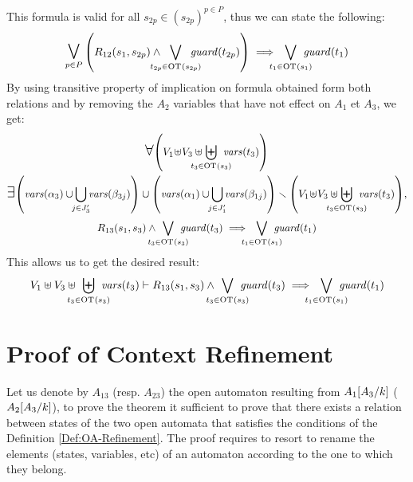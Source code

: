 \documentclass[runningheads]{llncs}
\begin{document}
\begin{enumerate}
This formula is valid for all $s_{2p} \in (s_{2p})^{p\in P}$,  thus we can state the following:
\begin{align*}
\operatorname*{\bigsymb{\bigvee}}_{p\in P}\mpar{R_{12}\mpar{s_1, s_{2p}} \wedge \bigvee_\subbox{t_{2p} \in \fOT{s_{2p}}} \fguard{t_{2p}} }  \implies \bigvee_\subbox{t_1 \in \fOT{s_1}} \fguard{t_1}
\end{align*}
By using transitive property of implication on formula obtained form both relations and by removing the $A_2$ variables that have not effect on   $A_1$ et  $A_3$, we get:
\begin{multline*}
\everymath{\displaystyle}
\bigforall \mpar{V_1\! \uplus\!V_3 \uplus\!\! \biguplus_\subbox{t_3 \in \fOT{s_3}} \fvars{t_3}}\\
\bigexists \mpar{\fvars{\alpha_{3}}  \cup \!\!\bigcup_{j \in J'_{3}} \!\!\fvars{\beta_{3j}}} \cup \mpar{\fvars{\alpha_{1}}  \cup\!\! \bigcup_{j \in J'_{1}} \!\!\fvars{\beta_{1j}}}
 \setminus \mpar{V_1\! \uplus\!V_3 \uplus\!\! \biguplus_\subbox{t_3 \in \fOT{s_3}} \fvars{t_3}},\\
R_{13}\mpar{s_1,s_3} \wedge \bigvee_\subbox{t_3 \in \fOT{s_3}} \fguard{t_3}
\implies \bigvee_\subbox{t_1 \in \fOT{s_1}} \fguard{t_1}
\end{multline*}
This allows us to get the desired result:
\begin{multline*}
V_1 \uplus V_3 \uplus \biguplus_\subbox{t_3 \in \fOT{s_3}} \fvars{t_3}
\vdash R_{13}\mpar{s_1,s_3} \wedge \bigvee_\subbox{t_3 \in \fOT{s_3}} \fguard{t_3}
\implies \bigvee_\subbox{t_1 \in \fOT{s_1}} \fguard{t_1}
\end{multline*}

\end{enumerate}

















\section{Proof of Context Refinement}

\proof
Let us denote by $A_{13}$ (resp. $A_{23}$) the open automaton resulting from $A_1{\left[A_3\middle/k\right]}$ ($A_2{\left[A_3\middle/k\right]}$),  to prove the theorem it sufficient to prove that there exists a relation between states of the two open automata that satisfies the conditions of the Definition \ref{Def:OA-Refinement}. The proof requires to resort to rename the elements (states, variables, etc) of an automaton according to the one to which they belong.
\end{document}
